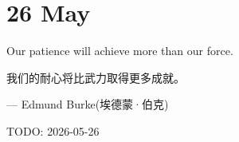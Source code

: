 \section{26 May}
Our patience will achieve more than our force.

我们的耐心将比武力取得更多成就。\par
\hfill --- Edmund Burke(埃德蒙·伯克)\par
\hfill TODO: 2026-05-26
